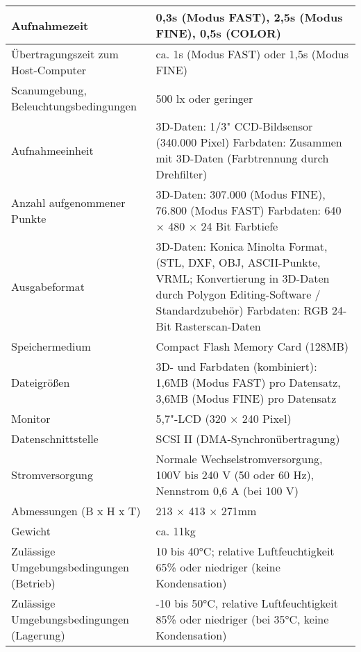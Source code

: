 \begin{longtable}{|m{4cm}|m{9cm}|}
Aufnahmezeit & 0,3s (Modus FAST), 2,5s (Modus FINE), 0,5s (COLOR)
 \\ \hline 
Übertragungszeit zum Host-Computer	 & ca. 1s (Modus FAST) oder 1,5s (Modus FINE)
 \\ \hline 
Scanumgebung, Beleuchtungsbedingungen	 & 500 lx oder geringer
 \\ \hline 
Aufnahmeeinheit & 3D-Daten: 1/3" CCD-Bildsensor (340.000 Pixel) 
Farbdaten: Zusammen mit 3D-Daten (Farbtrennung durch Drehfilter)
 \\ \hline 
Anzahl aufgenommener Punkte	 & 3D-Daten: 307.000 (Modus FINE), 76.800 (Modus FAST) 
Farbdaten: 640 × 480 × 24 Bit Farbtiefe
 \\ \hline 
Ausgabeformat & 3D-Daten: Konica Minolta Format, (STL, DXF, OBJ, ASCII-Punkte, VRML; Konvertierung in 3D-Daten durch Polygon Editing-Software / Standardzubehör)
Farbdaten: RGB 24-Bit Rasterscan-Daten
 \\ \hline 
Speichermedium & Compact Flash Memory Card (128MB)
 \\ \hline 
Dateigrößen & 3D- und Farbdaten (kombiniert): 1,6MB (Modus FAST) pro Datensatz, 3,6MB (Modus FINE) pro Datensatz 
 \\ \hline 
Monitor & 5,7"-LCD (320 × 240 Pixel)
 \\ \hline 
Datenschnittstelle & SCSI II (DMA-Synchronübertragung)
 \\ \hline 
Stromversorgung & Normale Wechselstromversorgung, 100V bis 240 V (50 oder 60 Hz), Nennstrom 0,6 A (bei 100 V) \\ \hline 
Abmessungen (B x H x T)	 & 213 × 413 × 271mm 
 \\ \hline 
Gewicht & ca. 11kg
 \\ \hline 
Zulässige Umgebungsbedingungen (Betrieb) & 10 bis 40°C; relative Luftfeuchtigkeit 65\% oder niedriger (keine Kondensation)
 \\ \hline 
Zulässige Umgebungsbedingungen (Lagerung) & -10 bis 50°C, relative Luftfeuchtigkeit 85\% oder niedriger (bei 35°C, keine Kondensation) 
 \\ \hline 
\end{longtable} 